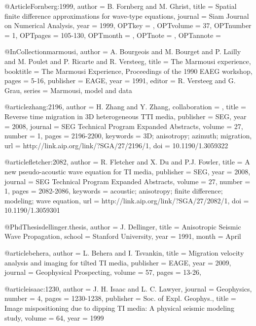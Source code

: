 @Article{Fornberg:1999,
  author = 	 {B. Fornberg and M. Ghrist},
  title = 	 {Spatial finite difference approximations for
                  wave-type equations},
  journal = 	 {Siam Journal on Numerical Analysis},
  year = 	 {1999},
  OPTkey = 	 {},
  OPTvolume = 	 {37},
  OPTnumber = 	 {1},
  OPTpages = 	 {105-130},
  OPTmonth = 	 {},
  OPTnote = 	 {},
  OPTannote = 	 {}
}

@InCollection{marmousi,
  author =	 {A. Bourgeois and M. Bourget and P. Lailly and
                  M. Poulet and P. Ricarte and R. Versteeg},
  title =	 {The {M}armousi experience},
  booktitle =	 {The Marmousi Experience, Proceedings of the 1990
                  EAEG workshop},
  pages =	 {5-16},
  publisher =    {EAGE},
  year =	 1991,
  editor =	 {R. Versteeg and G. Grau},
  series =	 {Marmousi, model and data}
}

@article{zhang:2196,
author = {H. Zhang and Y. Zhang},
collaboration = {},
title = {Reverse time migration in 3{D} heterogeneous {TTI} media},
publisher = {SEG},
year = {2008},
journal = {SEG Technical Program Expanded Abstracts},
volume = {27},
number = {1},
pages = {2196-2200},
keywords = {3D; anisotropy; azimuth; migration},
url = {http://link.aip.org/link/?SGA/27/2196/1},
doi = {10.1190/1.3059322}
}

@article{fletcher:2082,
  author =	 {R. Fletcher and X. Du and P.J. Fowler},
  title =	 {A new pseudo-acoustic wave equation for {TI} media},
  publisher =	 {SEG},
  year =	 2008,
  journal =	 {SEG Technical Program Expanded Abstracts},
  volume =	 27,
  number =	 1,
  pages =	 {2082-2086},
  keywords =	 {acoustic; anisotropy; finite difference; modeling;
                  wave equation},
  url =		 {http://link.aip.org/link/?SGA/27/2082/1},
  doi =		 {10.1190/1.3059301}
}

@PhdThesis{dellinger.thesis,
  author =	 {J. Dellinger},
  title =	 {Anisotropic Seismic Wave Propagation},
  school =	 {Stanford University},
  year =	 1991,
  month =	 {April}
}

@article{behera,
  author =	 {L. Behera and I. Tsvankin},
  title =	 {Migration velocity analysis and imaging for tilted
                  {TI} media},
  publisher =	 {EAGE},
  year =	 2009,
  journal =	 {Geophysical Prospecting},
  volume =	 57,
  pages =	 {13-26},
}

@article{isaac:1230,
  author =	 {J. H. Isaac and L. C. Lawyer},
  journal =	 {Geophysics},
  number =	 4,
  pages =	 {1230-1238},
  publisher =	 {Soc. of Expl. Geophys.},
  title =	 {Image mispositioning due to dipping {TI} media: {A}
                  physical seismic modeling study},
  volume =	 64,
  year =	 1999
}

